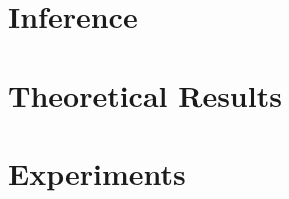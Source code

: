 \documentclass{amsart}
\theoremstyle{plain}
\numberwithin{equation}{section}
\begin{document}
\section{Inference}

\section{Theoretical Results}

\section{Experiments}


\newpage
\appendix

\newpage

\printbibliography[]
\end{document}
